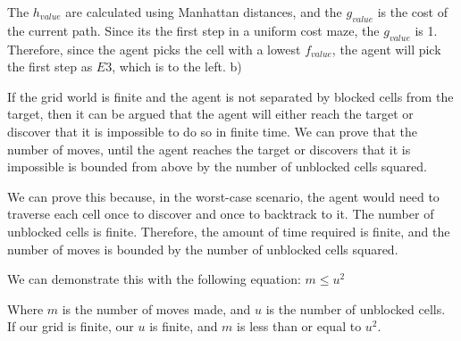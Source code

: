 \documentclass[10pt]{article}
\begin{document}
The $h_{value}$ are calculated using Manhattan distances, and the $g_{value}$ is the cost of the current path. Since its the first step in a uniform cost maze, the $g_{value}$ is 1.
Therefore, since the agent picks the cell with a lowest $f_{value}$, the agent will pick the first step as $E3$, which is to the left.
\newline
\newline
b)

If the grid world is finite and the agent is not separated by blocked cells from the target, then it can be argued that the agent will either reach the target or discover that it is impossible to do so in finite time. We can prove that the number of moves, until the agent reaches the target or discovers that it is impossible is bounded from above by the number of unblocked cells squared.\newline

 We can prove this because, in the worst-case scenario, the agent would need to traverse each cell once to discover and once to backtrack to it. The number of unblocked cells is finite. Therefore, the amount of time required is finite, and the number of moves is bounded by the number of unblocked cells squared. 

We can demonstrate this with the following equation:
\newline
\newline
$m \le u^{2}$
\newline
\newline

Where $m$ is the number of moves made, and $u$ is the number of unblocked cells. If our grid is finite, our $u$ is finite, and $m$ is less than or equal to $u^{2}$.
\end{document}
